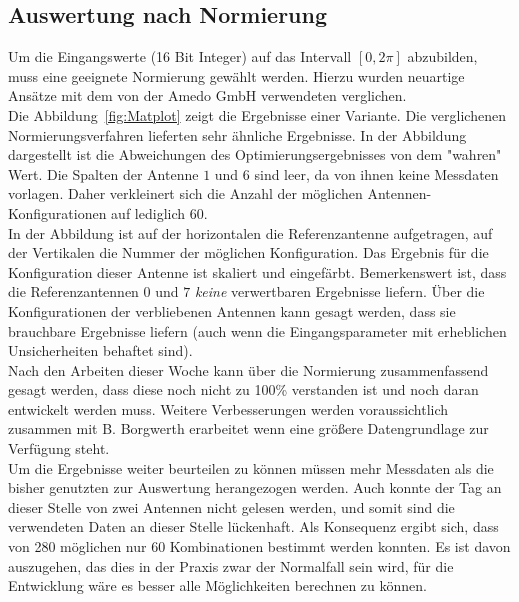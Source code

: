 \documentclass[a4paper,12pt,fleqn]{article}
\begin{document}
\subsection{Auswertung nach Normierung}
%
Um die Eingangswerte (16 Bit Integer) auf das Intervall $[0,2\pi]$ abzubilden, muss eine geeignete Normierung gewählt werden. Hierzu wurden neuartige Ansätze mit dem von der Amedo GmbH verwendeten verglichen. \\
Die Abbildung~\ref{fig:Matplot} zeigt die Ergebnisse einer Variante. Die verglichenen Normierungsverfahren lieferten sehr ähnliche Ergebnisse. In der Abbildung dargestellt ist die Abweichungen des Optimierungsergebnisses von dem "wahren" Wert. Die Spalten der Antenne $1$ und $6$ sind leer, da von ihnen keine Messdaten vorlagen. Daher verkleinert sich die Anzahl der möglichen Antennen-Konfigurationen auf lediglich $60$.\\ 
In der Abbildung ist auf der horizontalen die Referenzantenne aufgetragen, auf der Vertikalen die Nummer der möglichen Konfiguration. Das Ergebnis für die Konfiguration dieser Antenne ist skaliert und eingefärbt. Bemerkenswert ist, dass die Referenzantennen $0$ und $7$ \textit{keine} verwertbaren Ergebnisse liefern. Über die Konfigurationen der verbliebenen Antennen kann gesagt werden, dass sie brauchbare Ergebnisse liefern (auch wenn die Eingangsparameter mit erheblichen Unsicherheiten behaftet sind).\\
Nach den Arbeiten dieser Woche kann über die Normierung zusammenfassend gesagt werden, dass diese noch nicht zu 100\% verstanden ist und noch daran entwickelt werden muss. Weitere Verbesserungen werden voraussichtlich zusammen mit B. Borgwerth erarbeitet wenn eine größere Datengrundlage zur Verfügung steht.\\
Um die Ergebnisse weiter beurteilen zu können müssen mehr Messdaten als die bisher genutzten zur Auswertung herangezogen werden. Auch konnte der Tag an dieser Stelle von zwei Antennen nicht gelesen werden, und somit sind die verwendeten Daten an dieser Stelle lückenhaft. Als Konsequenz ergibt sich, dass von 280 möglichen nur 60 Kombinationen bestimmt werden konnten. Es ist davon auszugehen, das dies in der Praxis zwar der Normalfall sein wird, für die Entwicklung wäre es besser alle Möglichkeiten berechnen zu können.
%
\end{document}

